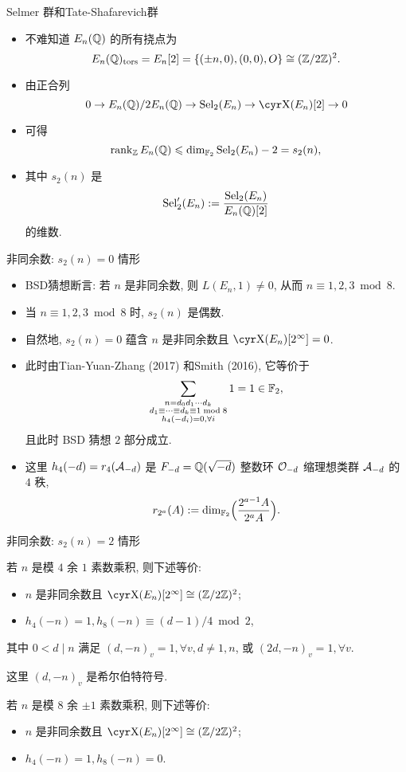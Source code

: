\documentclass[aspectratio=169]{ctexbeamer}
\begin{document}
\begin{frame}{Selmer 群和Tate-Shafarevich群}
	\begin{itemize}
		\item 不难知道 $E_n({\mathbb{Q}})$ 的所有挠点为
		\[
			E_n({\mathbb{Q}})_{{\mathrm{tors}}}
			=E_n[2]
			=\{(\pm n,0),(0,0),O\}
			\cong({\mathbb{Z}}/2{\mathbb{Z}})^2.
		\]
		\item 由正合列
		\[
			0\ra E_n(\BQ)/2E_n(\BQ)\ra \Sel_2(E_n)\ra \Sha(E_n)[2]\ra0
		\]
		\item 可得
		\[
			\operatorname{rank}_{\mathbb{Z}} E_n({\mathbb{Q}})\leqslant \dim_{{\mathbb{F}}_2}{\mathrm{Sel}}_2(E_n)-2=s_2(n),
		\]
		\item 其中 $s_2(n)$ 是
		\[
			{\mathrm{Sel}}'_2(E_n):=\frac{{\mathrm{Sel}}_2(E_n)}{E_n({\mathbb{Q}})[2]}
		\]
		的维数.
	\end{itemize}
\end{frame}


\begin{frame}{非同余数: $s_2(n)=0$ 情形}
	\begin{itemize}
		\item BSD猜想断言: 若 $n$ 是非同余数, 则 $L(E_n,1)\ne 0$, 从而 $n\equiv 1,2,3\bmod 8$.
		\item 当 $n\equiv 1,2,3\bmod 8$ 时, $s_2(n)$ 是偶数.
		\item 自然地, $s_2(n)=0$ 蕴含 $n$ 是非同余数且 $\Sha(E_n)[2^\infty]=0$.
		\item 此时由Tian-Yuan-Zhang (2017) 和Smith (2016), 它等价于
		\[
			\sum_{\substack{n=d_0d_1\cdots d_k\\ d_1\equiv\dots\equiv d_k\equiv 1\bmod 8\\ h_4(-d_i)=0,\forall i}}1=1\in{\mathbb{F}}_2,
		\]
		且此时 BSD 猜想 $2$ 部分成立.
		\item 这里 $h_4(-d)=r_4({\mathcal{A}}_{-d})$ 是 $F_{-d}={\mathbb{Q}}(\sqrt{-d})$ 整数环 ${\mathcal{O}}_{-d}$ 缩理想类群 ${\mathcal{A}}_{-d}$ 的 $4$ 秩, 
		\[
			r_{2^a}(A):=\dim_{{\mathbb{F}}_2}\Bigl(\frac{2^{a-1} A}{2^a A}\Bigr).
		\]
	\end{itemize}
\end{frame}


\begin{frame}{非同余数: $s_2(n)=2$ 情形}
	\onslide<+->
	\begin{theorem}[nearprev][{Wang 2016}]
		若 $n$ 是模 $4$ 余 $1$ 素数乘积, 则下述等价:
		\begin{itemize}[<*>]
			\item $n$ 是非同余数且 $\Sha(E_n)[2^\infty]\cong(\BZ/2\BZ)^2$;
			\item $h_4(-n)=1,h_8(-n)\equiv (d-1)/4\bmod 2$,
		\end{itemize}
		其中 $0<d\mid n$ 满足 $(d,-n)_v=1,\forall v, d\ne 1,n$, 或 $(2d,-n)_v=1,\forall v$.
	\end{theorem}
	这里 $(d,-n)_v$ 是希尔伯特符号.
	\onslide<+->
	\begin{theorem}
		若 $n$ 是模 $8$ 余 $\pm1$ 素数乘积, 则下述等价:
		\begin{itemize}[<*>]
			\item $n$ 是非同余数且 $\Sha(E_n)[2^\infty]\cong(\BZ/2\BZ)^2$;
			\item $h_4(-n)=1, h_8(-n)=0$.
		\end{itemize}
	\end{theorem}
\end{frame}
\end{document}
